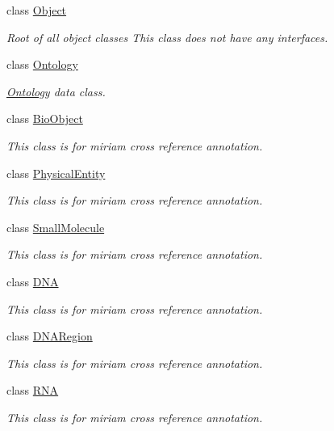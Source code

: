 \begin{DoxyCompactItemize}
class \hyperlink{classunisys_1_1Object}{Object}
\begin{DoxyCompactList}\small\item\em Root of all object classes This class does not have any interfaces. \end{DoxyCompactList}\item 
class \hyperlink{classunisys_1_1Ontology}{Ontology}
\begin{DoxyCompactList}\small\item\em \hyperlink{classunisys_1_1Ontology}{Ontology} data class. \end{DoxyCompactList}\item 
class \hyperlink{classunisys_1_1BioObject}{Bio\-Object}
\begin{DoxyCompactList}\small\item\em This class is for miriam cross reference annotation. \end{DoxyCompactList}\item 
class \hyperlink{classunisys_1_1PhysicalEntity}{Physical\-Entity}
\begin{DoxyCompactList}\small\item\em This class is for miriam cross reference annotation. \end{DoxyCompactList}\item 
class \hyperlink{classunisys_1_1SmallMolecule}{Small\-Molecule}
\begin{DoxyCompactList}\small\item\em This class is for miriam cross reference annotation. \end{DoxyCompactList}\item 
class \hyperlink{classunisys_1_1DNA}{D\-N\-A}
\begin{DoxyCompactList}\small\item\em This class is for miriam cross reference annotation. \end{DoxyCompactList}\item 
class \hyperlink{classunisys_1_1DNARegion}{D\-N\-A\-Region}
\begin{DoxyCompactList}\small\item\em This class is for miriam cross reference annotation. \end{DoxyCompactList}\item 
class \hyperlink{classunisys_1_1RNA}{R\-N\-A}
\begin{DoxyCompactList}\small\item\em This class is for miriam cross reference annotation. \end{DoxyCompactList}\item 

\end{DoxyCompactItemize}
